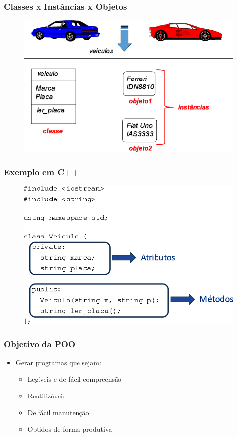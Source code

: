 \documentclass[aspectratio=169]{beamer}
\begin{document}
\begin{frame}\frametitle{Classes x Instâncias x Objetos}
\begin{figure}[h]
	\centering
	\includegraphics[height=0.7\paperheight]{imagens/carros.png}
\end{figure}
\end{frame}

\begin{frame}\frametitle{Exemplo em C++}
\begin{figure}[h]
	\centering
	\includegraphics[height=0.7\paperheight]{imagens/exemplo_c++.png}
\end{figure}
\end{frame}

\begin{frame}\frametitle{Objetivo da POO}
\begin{itemize}
	\item Gerar programas que sejam:
	\begin{itemize}
		\item Legíveis e de fácil compreensão
		\item Reutilizáveis
		\item De fácil manutenção
		\item Obtidos de forma produtiva
	\end{itemize}
\end{itemize}
\end{frame}
\end{document}
